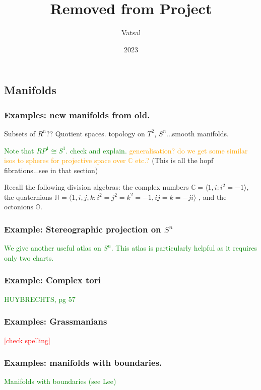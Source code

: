 \documentclass[a4paper]{article}
\theoremstyle{definition} \newtheorem*{definition}{Definition}
\theoremstyle{definition} \newtheorem*{definitions}{Definitions}
\theoremstyle{plain} \newtheorem{theorem}{Theorem}[section]
\theoremstyle{plain} \newtheorem{proposition}[theorem]{Proposition}
\theoremstyle{plain} \newtheorem{corollary}[theorem]{Corollary}
\theoremstyle{plain} \newtheorem{lemma}[theorem]{Lemma}
\theoremstyle{plain} \newtheorem{example}[theorem]{Example}
\newcommand{\checkCorrect}[1]{\textcolor{red}{#1}}
\newcommand{\question}[1]{\textcolor{orange}{#1}}
\newcommand{\finish}[1]{\textcolor{green}{#1}}
\newcommand{\complexnos}{\mathbb{C}}
\begin{document}
\title{Removed from Project}
\author{Vatsal}
\date{2023}
\maketitle

\subsection{Manifolds}

\subsubsection{Examples: new manifolds from old.}

Subsets of $R^n$?? Quotient spaces.
topology on $T^2$, $S^n$...smooth manifolds.

\finish{Note that $RP^1 \cong S^1$. check and explain.} \question{generalisation? do we get some similar isos to spheres for projective space over $\complexnos$ etc.?} (This is all the hopf fibrations...see in that section)

Recall the following division algebras: the complex numbers $\complexnos = \langle 1, i: i^2=-1 \rangle$, the quaternions $\mathbb{H} = \langle 1, i, j, k: i^2=j^2=k^2=-1, ij=k=-ji \rangle$ , and the octonions $\mathbb{O}$.

\subsubsection{Example: Stereographic projection on $S^n$}
\finish{We give another useful atlas on $S^n$. This atlas is particularly helpful as it requires only two charts.}

\subsubsection{Example: Complex tori}
\finish{HUYBRECHTS, pg 57}

\subsubsection{Examples: Grassmanians }
\checkCorrect{[check spelling]}

\subsubsection{Examples: manifolds with boundaries.}
\finish{Manifolds with boundaries (see Lee)}
\end{document}
